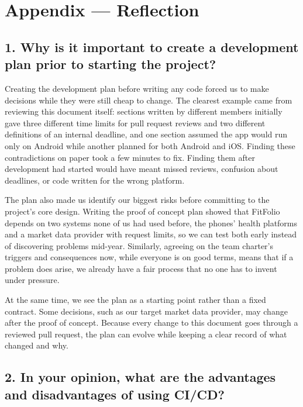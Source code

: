 \documentclass{article}
\begin{document}
\newpage{}

\section*{Appendix --- Reflection}





\subsection*{1. Why is it important to create a development plan prior to starting the project?}

Creating the development plan before writing any code forced us to make decisions while they were still cheap to change. The clearest example came from reviewing this document itself: sections written by different members initially gave three different time limits for pull request reviews and two different definitions of an internal deadline, and one section assumed the app would run only on Android while another planned for both Android and iOS. Finding these contradictions on paper took a few minutes to fix. Finding them after development had started would have meant missed reviews, confusion about deadlines, or code written for the wrong platform.

The plan also made us identify our biggest risks before committing to the project's core design. Writing the proof of concept plan showed that FitFolio depends on two systems none of us had used before, the phones' health platforms and a market data provider with request limits, so we can test both early instead of discovering problems mid-year. Similarly, agreeing on the team charter's triggers and consequences now, while everyone is on good terms, means that if a problem does arise, we already have a fair process that no one has to invent under pressure.

At the same time, we see the plan as a starting point rather than a fixed contract. Some decisions, such as our target market data provider, may change after the proof of concept. Because every change to this document goes through a reviewed pull request, the plan can evolve while keeping a clear record of what changed and why.

\subsection*{2. In your opinion, what are the advantages and disadvantages of using CI/CD?}
\end{document}
